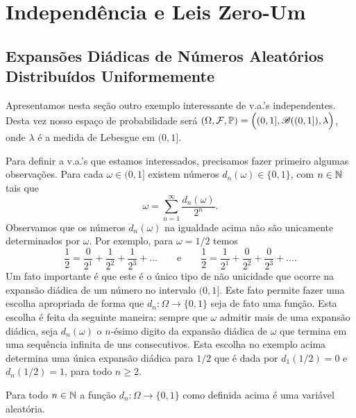 \chapter[Aula 7]{Independência e Leis Zero-Um}
\chaptermark{}

\section{Expansões Diádicas de Números Aleatórios Distribuídos Uniformemente}

Apresentamos nesta seção outro exemplo interessante
de v.a.'s independentes. Desta vez nosso espaço 
de probabilidade será 
$(\Omega,\mathcal{F},\mathbb{P})=\Big((0,1],\mathscr{B}((0,1]),\lambda\Big)$,
onde $\lambda$ é a medida de Lebesgue em $(0,1]$.

Para definir a v.a.'s que estamos interessados,
precisamos fazer primeiro algumas observações. 
Para cada $\omega\in (0,1]$ existem
números $d_n(\omega)\in\{0,1\}$, com $n\in\mathbb{N}$  
tais que 
	\[
		\omega = \sum_{n=1}^{\infty} \frac{d_n(\omega)}{2^n}.
	\] 
Observamos que os números $d_n(\omega)$ na igualdade 
acima não são unicamente determinados por $\omega$. Por exemplo, 
para $\omega=1/2$ temos 
	\[
		\frac{1}{2} = \frac{0}{2^1}+\frac{1}{2^2}+\frac{1}{2^3}+\ldots
		\qquad
		\text{e}
		\qquad
		\frac{1}{2}= \frac{1}{2^1}+\frac{0}{2^2}+\frac{0}{2^3}+\ldots.
	\]  
Um fato importante é que este é o único tipo 
de não unicidade que ocorre na expansão diádica de um 
número no intervalo $(0,1]$. 
Este fato permite fazer uma escolha apropriada
de forma que $d_n:\Omega\to\{0,1\}$ seja de fato 
uma função. Esta escolha é feita da seguinte maneira:
sempre que $\omega$ admitir mais de uma 
expansão diádica, 
seja $d_n(\omega)$ o $n$-ésimo digito da expansão 
diádica de $\omega$ que termina em uma sequência 
infinita de uns consecutivos.
Esta escolha no exemplo acima determina uma 
única expansão diádica para $1/2$ que é dada por $d_1(1/2)=0$ e
$d_n(1/2)=1$, para todo $n\geq 2$.

\begin{proposicao}
	Para todo $n\in\mathbb{N}$ a função $d_n:\Omega\to\{0,1\}$ 
	como definida acima é uma variável aleatória. 
\end{proposicao}



